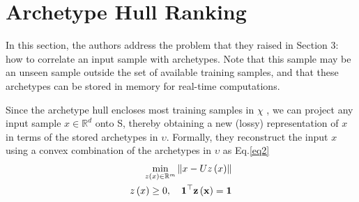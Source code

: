 \documentclass[10pt,twocolumn,letterpaper]{article}
\begin{document}
\section{Archetype Hull Ranking}
In this section, the authors address the problem that they raised in
Section 3: how to correlate an input sample with archetypes.
Note that this sample may be an unseen sample outside the
set of available training samples, and that these archetypes
can be stored in memory for real-time computations.
\par
Since the archetype hull encloses most training samples in $\chi$ , we can project any input sample $x \in \mathbb{R}^d$ onto S, thereby obtaining a new (lossy)
representation of $x$ in terms of the stored archetypes in $\upsilon$.
Formally, they reconstruct the input $x$ using a convex combination
of the archetypes in $\upsilon$ as Eq.\ref{eq2}
\begin{equation}
\begin{aligned}
\min_{z\left(x\right)\in\mathbb{R}^m}\left \| x-Uz\left(x\right) \right \| \\
 z\left(x\right) \geq 0, \quad \bf{1}^\top z\left(x\right)=1
\end{aligned}
\label{eq2}
\end{equation}

{\small


}
\end{document}
